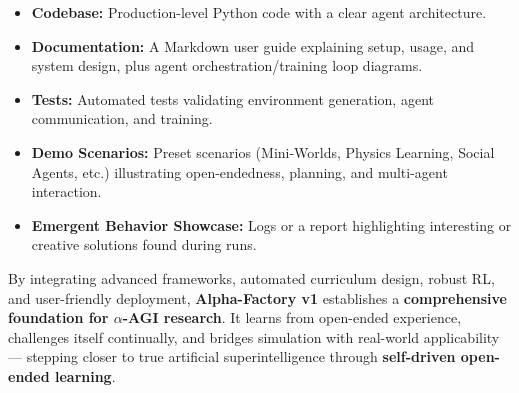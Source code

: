 \documentclass{article}
\begin{document}
\begin{itemize}
  \item \textbf{Codebase:} Production-level Python code with a clear agent architecture. 
  \item \textbf{Documentation:} A Markdown user guide explaining setup, usage, and system design, plus agent orchestration/training loop diagrams.
  \item \textbf{Tests:} Automated tests validating environment generation, agent communication, and training. 
  \item \textbf{Demo Scenarios:} Preset scenarios (Mini-Worlds, Physics Learning, Social Agents, etc.) illustrating open-endedness, planning, and multi-agent interaction.
  \item \textbf{Emergent Behavior Showcase:} Logs or a report highlighting interesting or creative solutions found during runs.
\end{itemize}

By integrating advanced frameworks, automated curriculum design, robust RL, and user-friendly deployment, \textbf{Alpha-Factory v1} establishes a \textbf{comprehensive foundation for \boldmath$\alpha$-AGI research}. It learns from open-ended experience, challenges itself continually, and bridges simulation with real-world applicability — stepping closer to true artificial superintelligence through \textbf{self-driven open-ended learning}.
\end{document}
